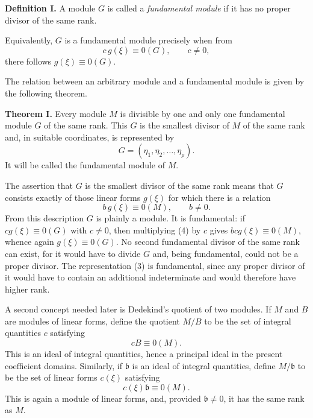 \documentclass[11pt]{article}
\begin{document}
\textbf{Definition I.} A module $G$ is called a \emph{fundamental module} if it has no proper divisor of the same rank.

Equivalently, $G$ is a fundamental module precisely when from
\begin{equation}
  c\,g(\xi)\equiv 0(G),\qquad c\ne 0,                              \tag{2}
\end{equation}
there follows $g(\xi)\equiv 0(G)$.

The relation between an arbitrary module and a fundamental module is given by the following theorem.

\textbf{Theorem I.} Every module $M$ is divisible by one and only one fundamental module $G$ of the same rank. This $G$ is the smallest divisor of $M$ of the same rank and, in suitable coordinates, is represented by
\begin{equation}
  G=(\eta_1,\eta_2,\ldots,\eta_\rho).                              \tag{3}
\end{equation}
It will be called the fundamental module of $M$.

The assertion that $G$ is the smallest divisor of the same rank means that $G$ consists exactly of those linear forms $g(\xi)$ for which there is a relation
\begin{equation}
  b\,g(\xi)
  \equiv 0(M),\qquad b\ne 0.                                      \tag{4}
\end{equation}
From this description $G$ is plainly a module. It is fundamental: if $c g(\xi)\equiv0(G)$ with $c\ne0$, then multiplying (4) by $c$ gives $bcg(\xi)\equiv0(M)$, whence again $g(\xi)\equiv0(G)$. No second fundamental divisor of the same rank can exist, for it would have to divide $G$ and, being fundamental, could not be a proper divisor. The representation (3) is fundamental, since any proper divisor of it would have to contain an additional indeterminate and would therefore have higher rank.

A second concept needed later is Dedekind's quotient of two modules. If $M$ and $B$ are modules of linear forms, define the quotient $M/B$ to be the set of integral quantities $c$ satisfying
\[
  cB\equiv0(M).
\]
This is an ideal of integral quantities, hence a principal ideal in the present coefficient domains. Similarly, if $\mathfrak b$ is an ideal of integral quantities, define $M/\mathfrak b$ to be the set of linear forms $c(\xi)$ satisfying
\[
  c(\xi)\mathfrak b\equiv0(M).
\]
This is again a module of linear forms, and, provided $\mathfrak b\ne0$, it has the same rank as $M$.
\end{document}

